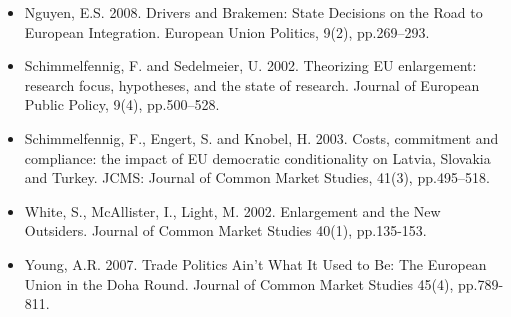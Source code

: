 \begin{itemize}
	\item Nguyen, E.S. 2008. Drivers and Brakemen: State Decisions on the Road to European Integration. European Union Politics, 9(2), pp.269–293.
	\item Schimmelfennig, F. and Sedelmeier, U. 2002. Theorizing EU enlargement: research focus, hypotheses, and the state of research. Journal of European Public Policy, 9(4), pp.500–528.
	\item Schimmelfennig, F., Engert, S. and Knobel, H. 2003. Costs, commitment and compliance: the impact of EU democratic conditionality on Latvia, Slovakia and Turkey. JCMS: Journal of Common Market Studies, 41(3), pp.495–518.
	\item White, S., McAllister, I., Light, M. 2002. Enlargement and the New Outsiders. Journal of Common Market Studies 40(1), pp.135-153. 
	\item Young, A.R. 2007. Trade Politics Ain’t What It Used to Be: The European Union in the Doha Round. Journal of Common Market Studies 45(4), pp.789-811.
\end{itemize}